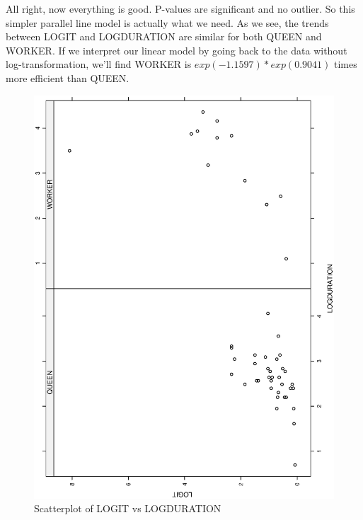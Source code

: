 \documentclass[a4paper,10pt]{article}
\begin{document}
All right, now everything is good. P-values are significant and no outlier. So this simpler parallel line model is actually what we need. As we see, the trends between LOGIT and LOGDURATION are similar for both QUEEN and WORKER. If we interpret our linear model by going back to the data without log-transformation, we'll find WORKER is $exp(-1.1597)*exp(0.9041)$ times more efficient than QUEEN.


\begin{figure}
\includegraphics[angle=-90, width=1\textwidth]{figures/math650_hw7_fig2.eps}
\caption{Scatterplot of LOGIT vs LOGDURATION}\label{f2}
\end{figure}
\end{document}
